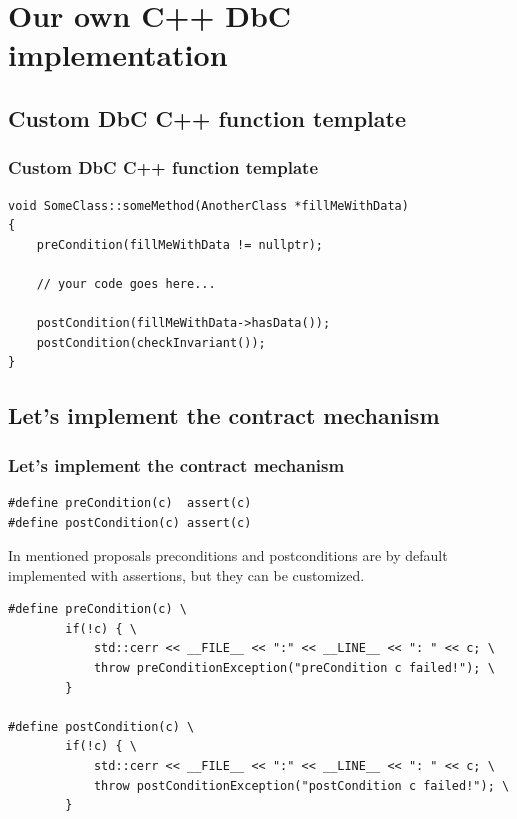 \documentclass{beamer}
\begin{document}
\section{Our own C++ DbC implementation}
\subsection{Custom DbC C++ function template}
\begin{frame}[fragile]
\frametitle{Custom DbC C++ function template}
\begin{lstlisting}
void SomeClass::someMethod(AnotherClass *fillMeWithData)
{
    preCondition(fillMeWithData != nullptr);

    // your code goes here...

    postCondition(fillMeWithData->hasData());
    postCondition(checkInvariant());
}
\end{lstlisting}
\end{frame}

\subsection{Let's implement the contract mechanism}
\begin{frame}[fragile]
\frametitle{Let's implement the contract mechanism}
\begin{lstlisting}
#define preCondition(c)  assert(c)
#define postCondition(c) assert(c)
\end{lstlisting}
\begin{block}{}
In mentioned proposals preconditions and postconditions are by default implemented with assertions, but they can be customized.
\end{block}
\pause

\begin{lstlisting}
#define preCondition(c) \
        if(!c) { \
            std::cerr << __FILE__ << ":" << __LINE__ << ": " << c; \
            throw preConditionException("preCondition c failed!"); \
        }
        
#define postCondition(c) \
        if(!c) { \
            std::cerr << __FILE__ << ":" << __LINE__ << ": " << c; \
            throw postConditionException("postCondition c failed!"); \
        }
\end{lstlisting}
\end{frame}
\end{document}
